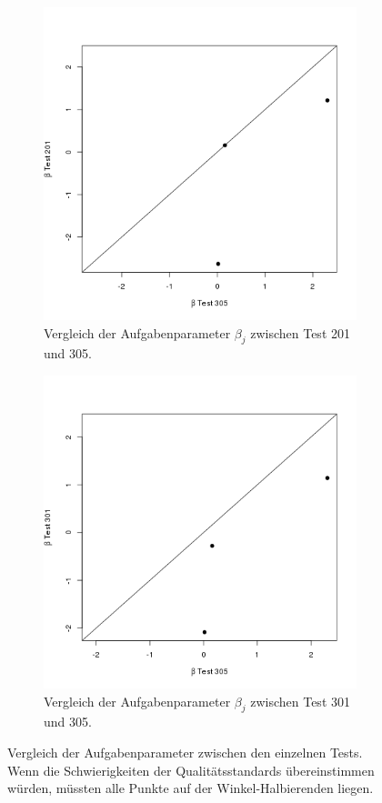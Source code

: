 \begin{figure}[htp]
\begin{subfigure}{0.32\textwidth}
    \includegraphics[width=1.0\linewidth]{graphics/GOF201305.png}
    \caption{Vergleich der Aufgabenparameter $\beta_j$ zwischen Test 201 und 305.}
    \label{fig:cor201305}
  \end{subfigure}
  \begin{subfigure}{0.32\textwidth}
    \includegraphics[width=1.0\linewidth]{graphics/GOF301305.png}
    \caption{Vergleich der Aufgabenparameter $\beta_j$ zwischen Test 301 und 305.}
    \label{fig:cor301305}
  \end{subfigure}
  
  \caption{Vergleich der Aufgabenparameter zwischen den einzelnen Tests. Wenn die Schwierigkeiten der Qualitätsstandards übereinstimmen würden, müssten alle Punkte auf der Winkel-Halbierenden liegen.}
  \label{fig:corTestQ}
  \end{figure}
 
